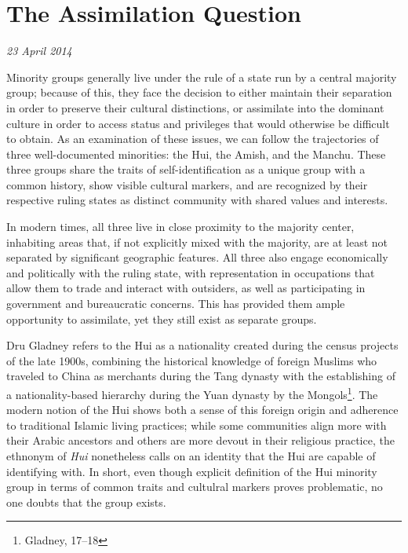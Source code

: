 \section{The Assimilation Question}

\textit{23 April 2014}

Minority groups generally live under the rule of a state run by a central
majority group; because of this, they face the decision to either maintain their
separation in order to preserve their cultural distinctions, or assimilate into
the dominant culture in order to access status and privileges that would
otherwise be difficult to obtain. As an examination of these issues, we can
follow the trajectories of three well-documented minorities: the Hui, the Amish,
and the Manchu. These three groups share the traits of self-identification as a
unique group with a common history, show visible cultural markers, and are
recognized by their respective ruling states as distinct community with shared
values and interests.

In modern times, all three live in close proximity to the majority center,
inhabiting areas that, if not explicitly mixed with the majority, are at least
not separated by significant geographic features. All three also engage
economically and politically with the ruling state, with representation in
occupations that allow them to trade and interact with outsiders, as well as
participating in government and bureaucratic concerns.  This has provided them
ample opportunity to assimilate, yet they still exist as separate groups.

Dru Gladney refers to the Hui as a nationality created during the census
projects of the late 1900s, combining the historical knowledge of foreign
Muslims who traveled to China as merchants during the Tang dynasty with the
establishing of a nationality-based hierarchy during the Yuan dynasty by the
Mongols\footnote{Gladney, 17--18}. The modern notion of the Hui shows both a
sense of this foreign origin and adherence to traditional Islamic living
practices; while some communities align more with their Arabic ancestors and
others are more devout in their religious practice, the ethnonym of \textit{Hui}
nonetheless calls on an identity that the Hui are capable of identifying with.
In short, even though explicit definition of the Hui minority group in terms of
common traits and cultulral markers proves problematic, no one doubts that the
group exists.

